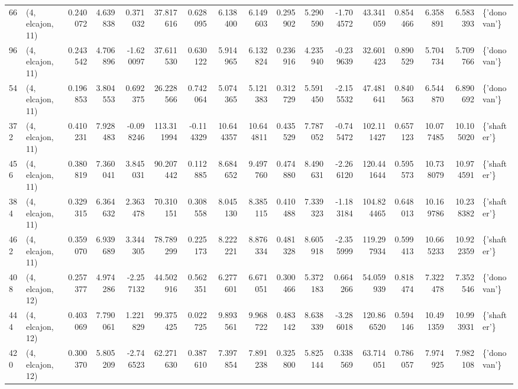 \begin{tabular}{llrrrrrrrrrrrrrrl}
66  &  (4, elcajon, 11) &   0.240072 &   4.639838 &   0.371032 &    37.817616 &   0.628095 &   6.138400 &   6.149603 &  0.295902 &   5.290590 &  -1.704572 &    43.341059 &   0.854466 &   6.358891 &   6.583393 &  \{'donovan'\} \\
96  &  (4, elcajon, 11) &   0.243542 &   4.706896 &  -1.620097 &    37.611530 &   0.630122 &   5.914965 &   6.132824 &  0.236916 &   4.235940 &  -0.239639 &    32.601423 &   0.890529 &   5.704734 &   5.709766 &  \{'donovan'\} \\
54  &  (4, elcajon, 11) &   0.196853 &   3.804553 &   0.692375 &    26.228566 &   0.742064 &   5.074365 &   5.121383 &  0.312729 &   5.591450 &  -2.155532 &    47.481641 &   0.840563 &   6.544870 &   6.890692 &  \{'donovan'\} \\
372 &  (4, elcajon, 11) &   0.410231 &   7.928483 &  -0.098246 &   113.311994 &  -0.114329 &  10.644357 &  10.644811 &  0.435529 &   7.787052 &  -0.745472 &   102.111427 &   0.657123 &  10.077485 &  10.105020 &  \{'shafter'\} \\
456 &  (4, elcajon, 11) &   0.380819 &   7.360041 &   3.845031 &    90.207442 &   0.112885 &   8.684652 &   9.497760 &  0.474880 &   8.490631 &  -2.266120 &   120.441644 &   0.595573 &  10.738079 &  10.974591 &  \{'shafter'\} \\
384 &  (4, elcajon, 11) &   0.329315 &   6.364632 &   2.363478 &    70.310151 &   0.308558 &   8.045130 &   8.385115 &  0.410488 &   7.339323 &  -1.183184 &   104.824465 &   0.648013 &  10.169786 &  10.238382 &  \{'shafter'\} \\
462 &  (4, elcajon, 11) &   0.359070 &   6.939689 &   3.344305 &    78.789299 &   0.225173 &   8.222221 &   8.876334 &  0.481328 &   8.605918 &  -2.355999 &   119.297934 &   0.599413 &  10.665233 &  10.922359 &  \{'shafter'\} \\
408 &  (4, elcajon, 12) &   0.257377 &   4.974286 &  -2.257132 &    44.502916 &   0.562351 &   6.277601 &   6.671051 &  0.300466 &   5.372183 &   0.664266 &    54.059939 &   0.818474 &   7.322478 &   7.352546 &  \{'donovan'\} \\
444 &  (4, elcajon, 12) &   0.403069 &   7.790061 &   1.221829 &    99.375425 &   0.022725 &   9.893561 &   9.968722 &  0.483142 &   8.638339 &  -3.286018 &   120.866520 &   0.594146 &  10.491359 &  10.993931 &  \{'shafter'\} \\
420 &  (4, elcajon, 12) &   0.300370 &   5.805209 &  -2.746523 &    62.271630 &   0.387610 &   7.397854 &   7.891238 &  0.325800 &   5.825144 &   0.338569 &    63.714051 &   0.786057 &   7.974925 &   7.982108 &  \{'donovan'\} \\

\end{tabular}
